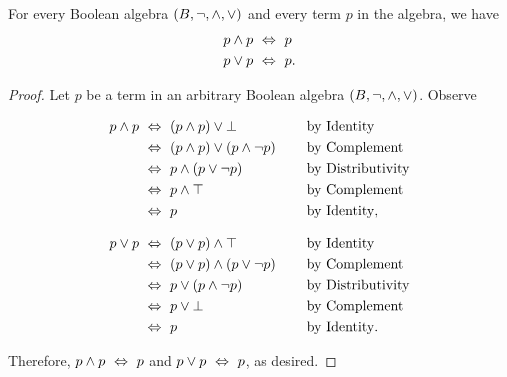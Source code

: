 \begin{theorem}[Idempotency]
    For every Boolean algebra $(B, \neg, \wedge, \vee)$ and every term $p$ in the algebra,
    we have
    \begin{align*}
        p \wedge p &~\Leftrightarrow~ p\\
        p \vee p &~\Leftrightarrow~ p.
    \end{align*}
\end{theorem}
\begin{proof}
    Let $p$ be a term in an arbitrary Boolean algebra $(B, \neg, \wedge, \vee)$.
    Observe

    \begin{minipage}{.45\linewidth}
        \vspace{-\parskip-\abovedisplayskip}
        \begin{alignat*}{2}
            p \wedge p &~\Leftrightarrow~ (p \wedge p) \vee \bot~~~~~~~~~~~~&&\text{by Identity}\\
                        &~\Leftrightarrow~ (p \wedge p) \vee (p \wedge \neg p) &&\text{by Complement}\\
                        &~\Leftrightarrow~ p \wedge (p \vee \neg p) &&\text{by Distributivity}\\
                        &~\Leftrightarrow~ p \wedge \top &&\text{by Complement}\\
                        &~\Leftrightarrow~ p &&\text{by Identity},
        \end{alignat*}
    \end{minipage}
    \hfill\vline\hfill
    \begin{minipage}{.45\linewidth}
        \vspace{-\parskip-\abovedisplayskip}
        \begin{alignat*}{2}
            p \vee p &~\Leftrightarrow~ (p \vee p) \wedge \top~~~~~~~~~~~~&&\text{by Identity}\\
                        &~\Leftrightarrow~ (p \vee p) \wedge (p \vee \neg p) &&\text{by Complement}\\
                        &~\Leftrightarrow~ p \vee (p \wedge \neg p) &&\text{by Distributivity}\\
                        &~\Leftrightarrow~ p \vee \bot &&\text{by Complement}\\
                        &~\Leftrightarrow~ p &&\text{by Identity}.
        \end{alignat*}
    \end{minipage}

    Therefore, $p \wedge p ~\Leftrightarrow~ p$ and $p \vee p ~\Leftrightarrow~ p$, as desired.
\end{proof}

